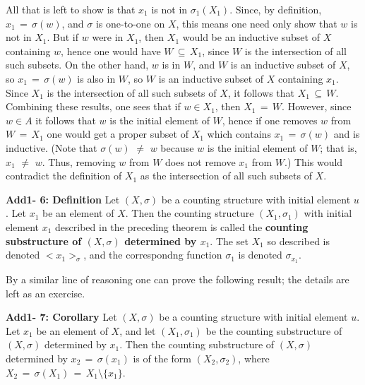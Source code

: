 {        All that is left to show is that $x_{1}$ is not in ${\sigma}_{1}(X_{1})$.
    Since, by definition, $x_{1} \,=\, {\sigma}(w)$, and ${\sigma}$ is one-to-one on $X$, this means one need only show that $w$ is not in $X_{1}$.
    But if $w$ were in $X_{1}$, then $X_{1}$ would be an inductive subset of $X$ containing $w$,
    hence one would have $W \,{\subseteq}\, X_{1}$, since $W$ is the intersection of all such subsets.
    On the other hand, $w$ is in $W$, and $W$ is an inductive subset of $X$, so $x_{1} \,=\, {\sigma}(w)$ is also in $W$, so $W$ is an inductive subset of $X$ containing $x_{1}$.
    Since $X_{1}$ is the intersection of all such subsets of $X$, it follows that $X_{1} \,{\subseteq}\, W$.
    Combining these results, one sees that if $w{\in}X_{1}$, then $X_{1} \,=\, W$.
    However, since $w{\in}A$ it follows that $w$ is the initial element of $W$, hence if one removes $w$ from $W \,=\, X_{1}$ one would get a proper subset of $X_{1}$ which contains $x_{1} \,=\, {\sigma}(w)$ and is inductive.
    (Note that ${\sigma}(w) \,\,{\neq}\,\, w$ because $w$ is the initial element of $W$; that is, $x_{1} \,\,{\neq}\,\, w$. Thus, removing $w$ from $W$ does not remove $x_{1}$ from $W$.)
    This would contradict the definition of $X_{1}$ as the intersection of all such subsets of $X$.

\V

        {\bf Add1- 6: Definition} Let $(X,{\sigma})$ be a counting structure with initial element $u$.
    Let $x_{1}$ be an element of $X$. Then the counting structure $(X_{1},{\sigma}_{1})$ with initial element $x_{1}$
    described in the preceding theorem is called the {\bf counting substructure of $(X,{\sigma})$ determined by $x_{1}$}.
    The set $X_{1}$ so described is denoted $<x_{1}>_{{\sigma}}$, and the correspondng function ${\sigma}_{1}$ is denoted ${\sigma}_{x_{1}}$.

\V
\V

        By a similar line of reasoning one can prove the following result; the details are left as an exercise.

\V

        {\bf Add1- 7: Corollary} Let $(X,{\sigma})$ be a counting structure with initial element $u$.
    Let $x_{1}$ be an element of $X$, and let $(X_{1},{\sigma}_{1})$ be the counting substructure of $(X,{\sigma})$ determined by $x_{1}$.
    Then the counting substructure of $(X,{\sigma})$ determined by $x_{2} \,=\, {\sigma}(x_{1})$ is of the form $(X_{2},{\sigma}_{2})$,
    where $X_{2} \,=\, {\sigma}(X_{1}) \,=\, X_{1}{\setminus}\{x_{1}\}$.

}
